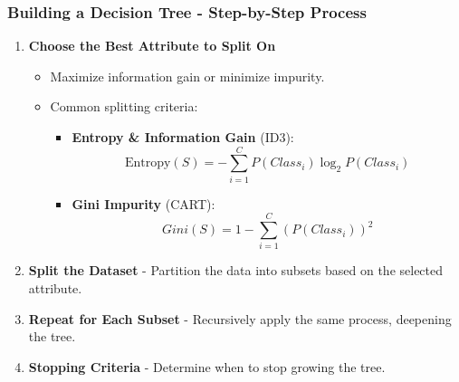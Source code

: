 \documentclass[aspectratio=169]{beamer}
\begin{document}
\begin{frame}[fragile]
    \frametitle{Building a Decision Tree - Step-by-Step Process}
    \begin{enumerate}
        \item \textbf{Choose the Best Attribute to Split On}
        \begin{itemize}
            \item Maximize information gain or minimize impurity.
            \item Common splitting criteria:
            \begin{itemize}
                \item \textbf{Entropy & Information Gain} (ID3):
                \begin{equation}
                    \text{Entropy}(S) = -\sum_{i=1}^{C} P(Class_i) \log_2 P(Class_i)
                \end{equation}
                \item \textbf{Gini Impurity} (CART):
                \begin{equation}
                    Gini(S) = 1 - \sum_{i=1}^C (P(Class_i))^2
                \end{equation}
            \end{itemize}
        \end{itemize}

        \item \textbf{Split the Dataset} - Partition the data into subsets based on the selected attribute.

        \item \textbf{Repeat for Each Subset} - Recursively apply the same process, deepening the tree.

        \item \textbf{Stopping Criteria} - Determine when to stop growing the tree.
    \end{enumerate}
\end{frame}
\end{document}
